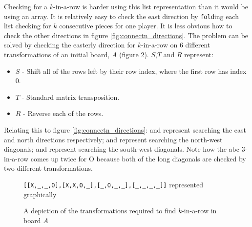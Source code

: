 Checking for a $k$-in-a-row is harder using this list representation than it would be using an array. It is relatively easy to check the east direction by \texttt{fold}ing each list checking for $k$ consecutive pieces for one player. It is less obvious how to check the other directions in figure \ref{fig:connectn_directions}. The problem can be solved by checking the easterly direction for $k$-in-a-row on 6 different transformations of an initial board, $A$ (figure \ref{fig:transforms}). $S$,$T$ and $R$ represent: 
\begin{itemize}
\item[] $S$ - Shift all of the rows left by their row index, where the first row has index 0.
\item[] $T$ - Standard matrix transposition.
\item[] $R$ - Reverse each of the rows.
\end{itemize}
Relating this to figure \protect\ref{fig:connectn_directions}: \protect{} and \protect{} represent searching the east and north directions respectively; \protect{} and \protect{} represent searching the north-west diagonals; \protect{} and \protect{} represent searching the south-west diagonals. Note how the abc $3$-in-a-row comes up twice for O because both of the long diagonals are checked by two different transformations.

\begin{figure}[]
\centering
\scalebox{0.5}{}
\caption{\texttt{[[X,\_,\_,O],[X,X,O,\_],[\_,O,\_,\_],[\_,\_,\_,\_]]} represented graphically}
\label{fig:list_of_lists}
\end{figure}

\begin{figure}[]
\centering
\subfloat[][$A$]{
\scalebox{0.4}{}
\label{fig:transforms:I}
}
\subfloat[][$A^{ST}$]{
\scalebox{0.4}{}
\label{fig:transforms:IDT}
}
\subfloat[][$A^{RST}$]{
\scalebox{0.4}{}
\label{fig:transforms:IRDT}
}
\linebreak
\subfloat[][$A^{T}$]{
\scalebox{0.4}{}
\label{fig:transforms:IT}
}
\subfloat[][$A^{TST}$]{
\scalebox{0.4}{}
\label{fig:transforms:ITDT}
}
\subfloat[][$A^{TRTST}$]{
\scalebox{0.4}{}
\label{fig:transforms:ITRDT}
}

\caption{\label{fig:transforms}A depiction of the transformations required to find $k$-in-a-row in board $A$} 

\end{figure}

